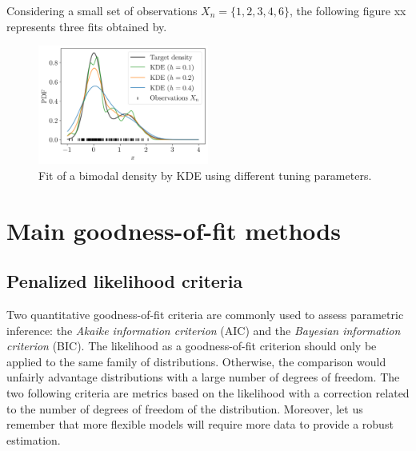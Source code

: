 \begin{example}
    \label{ex:kde}
    Considering a small set of observations $X_n = \{1, 2, 3, 4, 6\}$, the following figure xx represents three fits obtained by. 
    \begin{figure}[H]
        \centering
        \includegraphics[width=0.5\textwidth]{../numerical_experiments/chapter1/figures/KDE.png}
        \caption{Fit of a bimodal density by KDE using different tuning parameters.}
        \label{fig:KDE}
    \end{figure}
\end{example}

\section*{Main goodness-of-fit methods}

\subsection*{Penalized likelihood criteria}
Two quantitative goodness-of-fit criteria are commonly used to assess parametric inference: the \textit{Akaike information criterion} (AIC) and the \textit{Bayesian information criterion} (BIC). 
The likelihood as a goodness-of-fit criterion should only be applied to the same family of distributions. 
Otherwise, the comparison would unfairly advantage distributions with a large number of degrees of freedom.
The two following criteria are metrics based on the likelihood with a correction related to the number of degrees of freedom of the distribution. 
Moreover, let us remember that more flexible models will require more data to provide a robust estimation. 

